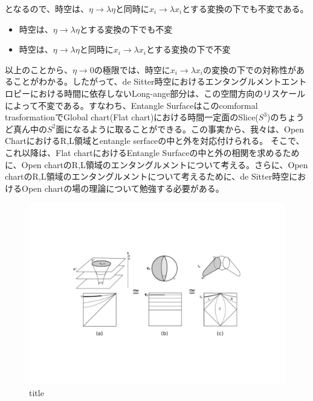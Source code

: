 となるので、時空は、$\eta\to\lambda\eta$と同時に$x_{i}\to\lambda x_{i}$とする変換の下でも不変である。
\begin{itemize}
  \item{時空は、$\eta\to\lambda\eta$とする変換の下でも不変}
  \item{時空は、$\eta\to\lambda\eta$と同時に$x_{i}\to\lambda x_{i}$とする変換の下で不変}
\end{itemize}
以上のことから、$\eta\to0$の極限では、時空に$x_{i}\to\lambda x_{i}$の変換の下での対称性があることがわかる。したがって、de Sitter時空におけるエンタングルメントエントロピーにおける時間に依存しないLong-ange部分は、この空間方向のリスケールによって不変である。すなわち、Entangle Surfaceはこのcomformal trasformationでGlobal chart(Flat chart)における時間一定面のSlice($S^3$)のちょうど真ん中の$S^2$面になるように取ることができる。この事実から、我々は、Open ChartにおけるR,L領域とentangle serfaceの中と外を対応付けられる。
そこで、これ以降は、Flat chartにおけるEntangle Surfaceの中と外の相関を求めるために、Open chartのR,L領域のエンタングルメントについて考える。さらに、Open chartのR,L領域のエンタングルメントについて考えるために、de Sitter時空におけるOpen chartの場の理論について勉強する必要がある。


  \begin{figure}[H]
    \begin{center}
    \includegraphics[width=14cm,angle=0]{de.pdf}
    \caption{title}
    \end{center}
  \end{figure}

